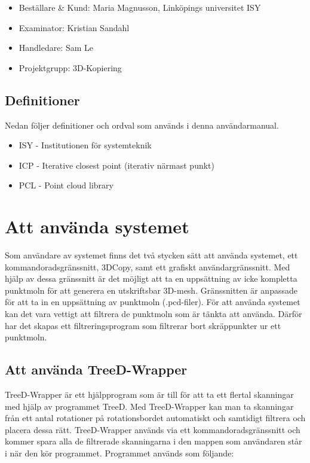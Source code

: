 \documentclass[a4paper,titlepage,12pt]{article}
\begin{document}
		\begin{itemize}
			\item Beställare \& Kund: Maria Magnusson, Linköpings universitet ISY
			\item Examinator: Kristian Sandahl
			\item Handledare: Sam Le
			\item Projektgrupp: 3D-Kopiering
		\end{itemize}
		
	\subsection{Definitioner}
		Nedan följer definitioner och ordval som används i denna användarmanual.
		
		\begin{itemize}
			\item ISY - Institutionen för systemteknik
			\item ICP - Iterative closest point (iterativ närmast punkt)
			\item PCL - Point cloud library
		\end{itemize}
    
\newpage  

\section{Att använda systemet}
	Som användare av systemet finns det två stycken sätt att använda systemet, ett kommandoradsgränssnitt, 3DCopy, samt ett grafiskt användargränssnitt. Med hjälp av dessa gränssnitt är det möjligt att ta en uppsättning av icke kompletta punktmoln för att generera en utskriftsbar 3D-mesh. Gränssnitten är anpassade för att ta in en uppsättning av punktmoln (.pcd-filer). För att använda systemet kan det vara vettigt att filtrera de punktmoln som är tänkta att använda. Därför har det skapas ett filtreringsprogram som filtrerar bort skräppunkter ur ett punktmoln.
	
	\subsection{Att använda TreeD-Wrapper}
	TreeD-Wrapper är ett hjälpprogram som är till för att ta ett flertal skanningar med hjälp av programmet TreeD. Med TreeD-Wrapper kan man ta skanningar från ett antal rotationer på rotationsbordet automatiskt och samtidigt filtrera och placera dessa rätt. TreeD-Wrapper används via ett kommandoradsgränssnitt och kommer spara alla de filtrerade skanningarna i den mappen som användaren står i när den kör programmet. Programmet används som följande:
	
\end{document}
